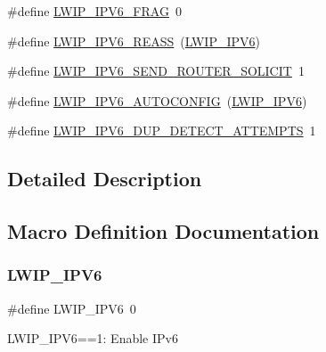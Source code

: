 \begin{DoxyCompactItemize}
\#define \hyperlink{group__lwip__opts__ipv6_ga9ab6269f3087f6d9f7b2c7181ef043c3}{L\+W\+I\+P\+\_\+\+I\+P\+V6\+\_\+\+F\+R\+AG}~0
\item 
\#define \hyperlink{group__lwip__opts__ipv6_gad0ef160d72e63b02c5e875b06ec53864}{L\+W\+I\+P\+\_\+\+I\+P\+V6\+\_\+\+R\+E\+A\+SS}~(\hyperlink{openmote-cc2538_2lwip_2test_2fuzz_2lwipopts_8h_a872e3bb3fe2212156d66b18fccc9643f}{L\+W\+I\+P\+\_\+\+I\+P\+V6})
\item 
\#define \hyperlink{group__lwip__opts__ipv6_ga273ed2e1a4e6a43713a0e4a06a34ee5c}{L\+W\+I\+P\+\_\+\+I\+P\+V6\+\_\+\+S\+E\+N\+D\+\_\+\+R\+O\+U\+T\+E\+R\+\_\+\+S\+O\+L\+I\+C\+IT}~1
\item 
\#define \hyperlink{group__lwip__opts__ipv6_ga580039bf2baf49fcb9e504e5d2b40a03}{L\+W\+I\+P\+\_\+\+I\+P\+V6\+\_\+\+A\+U\+T\+O\+C\+O\+N\+F\+IG}~(\hyperlink{openmote-cc2538_2lwip_2test_2fuzz_2lwipopts_8h_a872e3bb3fe2212156d66b18fccc9643f}{L\+W\+I\+P\+\_\+\+I\+P\+V6})
\item 
\#define \hyperlink{group__lwip__opts__ipv6_gad8489522d34f37e42b4001bab3781bcb}{L\+W\+I\+P\+\_\+\+I\+P\+V6\+\_\+\+D\+U\+P\+\_\+\+D\+E\+T\+E\+C\+T\+\_\+\+A\+T\+T\+E\+M\+P\+TS}~1
\end{DoxyCompactItemize}


\subsection{Detailed Description}


\subsection{Macro Definition Documentation}
\mbox{\label{group__lwip__opts__ipv6_ga872e3bb3fe2212156d66b18fccc9643f}} 
\subsubsection{\texorpdfstring{L\+W\+I\+P\+\_\+\+I\+P\+V6}{LWIP\_IPV6}\hspace{0.1cm}{\footnotesize\ttfamily [1/2]}}
{\footnotesize\ttfamily \#define L\+W\+I\+P\+\_\+\+I\+P\+V6~0}

L\+W\+I\+P\+\_\+\+I\+P\+V6==1\+: Enable I\+Pv6 \mbox{\label{group__lwip__opts__ipv6_ga872e3bb3fe2212156d66b18fccc9643f}} 
